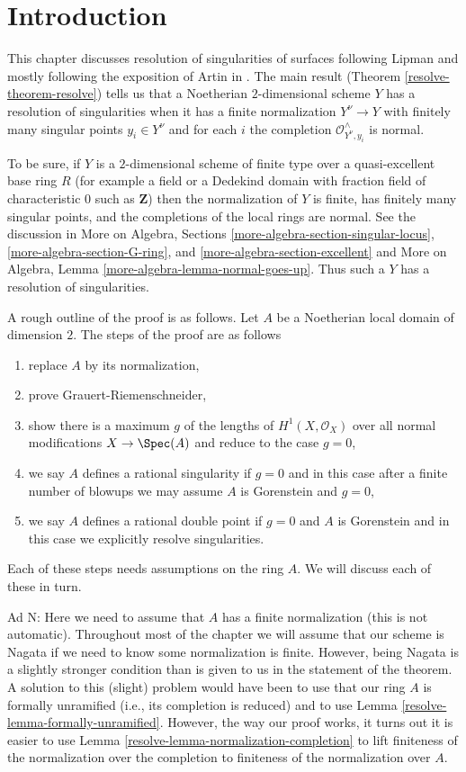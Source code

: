 \section{Introduction}
\label{resolve-section-introduction}
This chapter discusses resolution of singularities of surfaces
following Lipman \cite{Lipman} and mostly following the exposition of
Artin in \cite{Artin-Lipman}. The main result
(Theorem \ref{resolve-theorem-resolve}) tells us that a Noetherian
$2$-dimensional scheme $Y$ has a resolution of singularities when
it has a finite normalization $Y^\nu \to Y$ with
finitely many singular points $y_i \in Y^\nu$ and for each $i$ the completion
$\mathcal{O}_{Y^\nu, y_i}^\wedge$ is normal.

\medskip\noindent
To be sure, if $Y$ is a $2$-dimensional scheme of finite type over
a quasi-excellent base ring $R$ (for example a field or a
Dedekind domain with fraction field of characteristic $0$
such as $\mathbf{Z}$) then the normalization of $Y$ is finite,
has finitely many singular points, and the completions of the
local rings are normal. See the discussion in
More on Algebra, Sections
\ref{more-algebra-section-singular-locus},
\ref{more-algebra-section-G-ring}, and
\ref{more-algebra-section-excellent}
and
More on Algebra, Lemma \ref{more-algebra-lemma-normal-goes-up}.
Thus such a $Y$ has a resolution of singularities.

\medskip\noindent
A rough outline of the proof is as follows. Let $A$ be a
Noetherian local domain of dimension $2$. The steps of the proof
are as follows
\begin{enumerate}
\item[N] replace $A$ by its normalization,
\item[V] prove Grauert-Riemenschneider,
\item[B] show there is a maximum $g$ of the lengths of
$H^1(X, \mathcal{O}_X)$ over all normal modifications $X \to \Spec(A)$
and reduce to the case $g = 0$,
\item[R] we say $A$ defines a rational singularity if $g = 0$
and in this case after a finite number of
blowups we may assume $A$ is Gorenstein and $g = 0$,
\item[D] we say $A$ defines a rational double point if
$g = 0$ and $A$ is Gorenstein and in this case we
explicitly resolve singularities.
\end{enumerate}
Each of these steps needs assumptions on the ring $A$.
We will discuss each of these in turn.

\medskip\noindent
Ad N: Here we need to assume that $A$ has a finite normalization
(this is not automatic). Throughout most of the chapter we will
assume that our scheme is Nagata if we need to know some normalization
is finite. However, being Nagata is a slightly stronger condition
than is given to us in the statement of the theorem.
A solution to this (slight) problem would have been to use that
our ring $A$ is formally unramified (i.e., its completion
is reduced) and to use Lemma \ref{resolve-lemma-formally-unramified}.
However, the way our proof works, it turns out it is easier to
use Lemma \ref{resolve-lemma-normalization-completion}
to lift finiteness of the normalization over the
completion to finiteness of the normalization over $A$.

